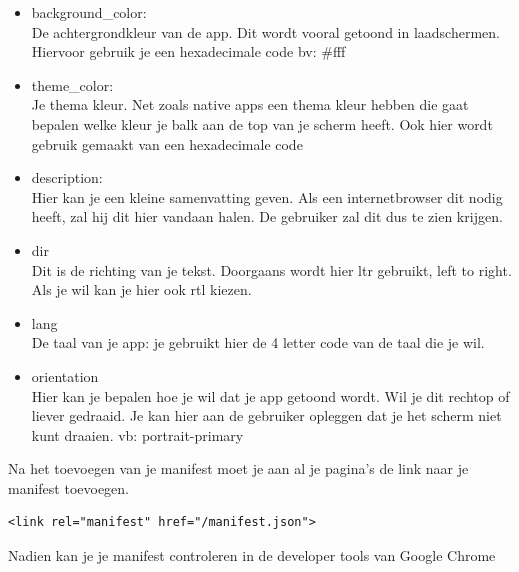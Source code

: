 \begin{itemize}
	\item background\_color: \\
De achtergrondkleur van de app. Dit wordt vooral getoond in laadschermen. Hiervoor gebruik je een hexadecimale code bv: #fff
\\


	\item theme\_color: \\
	Je thema kleur. Net zoals native apps een thema kleur hebben die gaat bepalen welke kleur je balk aan de top van je scherm heeft. Ook hier wordt gebruik gemaakt van een hexadecimale code
	\\
	\item description: \\
	Hier kan je een kleine samenvatting geven. Als een internetbrowser dit nodig heeft, zal hij dit hier vandaan halen. De gebruiker zal dit dus te zien krijgen.	
	\\
	\item dir \\
	Dit is de richting van je tekst. Doorgaans wordt hier ltr gebruikt, left to right. Als je wil kan je hier ook rtl kiezen.
	\\
	\item lang \\
	De taal van je app: je gebruikt hier de 4 letter code van de taal die je wil.
	\\
	\item orientation \\
	Hier kan je bepalen hoe je wil dat je app getoond wordt. Wil je dit rechtop of liever gedraaid. Je kan hier aan de gebruiker opleggen dat je het scherm niet kunt draaien. vb: portrait-primary
	\\
	
\end{itemize}


Na het toevoegen van je manifest moet je aan al je pagina's de link naar je manifest toevoegen.
\begin{lstlisting}
<link rel="manifest" href="/manifest.json">
\end{lstlisting}

Nadien kan je je manifest controleren in de developer tools van Google Chrome


